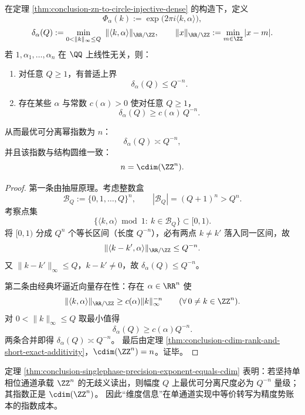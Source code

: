 \begin{theorem}[单相位压缩的精度指数等于圆维]\label{thm:conclusion-singlephase-precision-exponent-equals-cdim}
在定理 \ref{thm:conclusion-zn-to-circle-injective-dense} 的构造下，定义
\[
\Phi_\alpha(k):=\exp\!\bigl(2\pi i\langle k,\alpha\rangle\bigr),
\]
\[
\delta_\alpha(Q):=\min_{0<\|k\|_\infty\le Q}\ \|\langle k,\alpha\rangle\|_{\RR/\ZZ},
\qquad
\|x\|_{\RR/\ZZ}:=\min_{m\in\ZZ}|x-m|.
\]
若 \(1,\alpha_1,\dots,\alpha_n\) 在 \(\QQ\) 上线性无关，则：
\begin{enumerate}
  \item 对任意 \(Q\ge 1\)，有普适上界
  \[
  \delta_\alpha(Q)\le Q^{-n}.
  \]
  \item 存在某些 \(\alpha\) 与常数 \(c(\alpha)>0\) 使对任意 \(Q\ge 1\)，
  \[
  \delta_\alpha(Q)\ge c(\alpha)\,Q^{-n}.
  \]
\end{enumerate}
从而最优可分离幂指数为 \(n\)：
\[
\delta_\alpha(Q)\asymp Q^{-n},
\]
并且该指数与结构圆维一致：
\[
n=\cdim(\ZZ^n).
\]
\end{theorem}
\begin{proof}
第一条由抽屉原理。考虑整数盒
\[
\mathcal B_Q:=\{0,1,\dots,Q\}^n,\qquad |\mathcal B_Q|=(Q+1)^n>Q^n.
\]
考察点集
\[
\{\langle k,\alpha\rangle\bmod 1:\ k\in\mathcal B_Q\}\subset [0,1).
\]
将 \([0,1)\) 分成 \(Q^n\) 个等长区间（长度 \(Q^{-n}\)），必有两点 \(k\neq k'\) 落入同一区间，故
\[
\|\langle k-k',\alpha\rangle\|_{\RR/\ZZ}\le Q^{-n}.
\]
又 \(\|k-k'\|_\infty\le Q\)，\(k-k'\neq 0\)，故 \(\delta_\alpha(Q)\le Q^{-n}\)。

第二条由经典坏逼近向量存在性：存在 \(\alpha\in\RR^n\) 使
\[
\|\langle k,\alpha\rangle\|_{\RR/\ZZ}\ge c(\alpha)\|k\|_\infty^{-n}\qquad(\forall\,0\neq k\in\ZZ^n).
\]
对 \(0<\|k\|_\infty\le Q\) 取最小值得
\[
\delta_\alpha(Q)\ge c(\alpha)Q^{-n}.
\]
两条合并即得 \(\delta_\alpha(Q)\asymp Q^{-n}\)。
最后由定理 \ref{thm:conclusion-cdim-rank-and-short-exact-additivity}，\(\cdim(\ZZ^n)=n\)。证毕。
\end{proof}

\begin{remark}[圆维与精度势的操作学对应]\label{rem:conclusion-cdim-singlephase-precision-ledger}
定理 \ref{thm:conclusion-singlephase-precision-exponent-equals-cdim} 表明：若坚持单相位通道承载 \(\ZZ^n\) 的无歧义读出，则幅度 \(Q\) 上最优可分离尺度必为 \(Q^{-n}\) 量级；其指数正是 \(\cdim(\ZZ^n)\)。
因此“维度信息”在单通道实现中等价转写为精度势账本的指数成本。
\end{remark}


